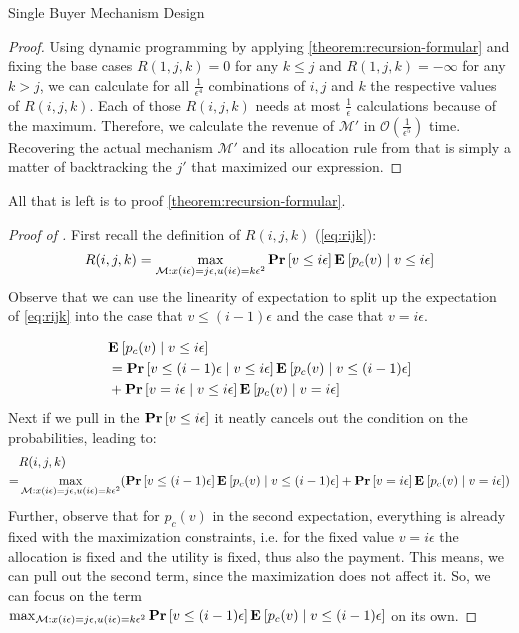 \documentclass[11pt,a4paper]{article}
\renewcommand{\Pr}[1]{\mbox{\rm\bf Pr}\left[#1\right]}
\newcommand{\Ex}[2][]{\mbox{\rm\bf E}_{#1}\left[#2\right]}
\newcommand{\1}[1]{\mbox{\rm\bf 1}_{#1}}
\begin{document}
\begin{section}{Single Buyer Mechanism Design}
\begin{proof}
     Using dynamic programming by applying \cref{theorem:recursion-formular} and fixing the base cases $R(1,j,k) = 0$ for any $k \leq j$ and $R(1,j,k)=-\infty$ for any $k > j$,
     we can calculate for all $\frac{1}{\epsilon^4}$ combinations of $i,j$ and $k$ the respective values of $R(i,j,k)$.
     Each of those $R(i,j,k)$ needs at most $\frac{1}{\epsilon}$ calculations because of the maximum.
     Therefore, we calculate the revenue of $\mathcal{M}'$ in $\mathcal{O}\left(\frac{1}{\epsilon^5}\right)$ time.
     Recovering the actual mechanism $\mathcal{M}'$ and its allocation rule from that is simply a matter of backtracking the $j'$ that maximized our expression.
 \end{proof}

 All that is left is to proof \cref{theorem:recursion-formular}.
 \begin{proof}[Proof of ]
     First recall the definition of $R(i,j,k)$ (\cref{eq:rijk}):
     \begin{align*}
         R(i,j,k) = \max_{\mathcal{M}: x(i\epsilon) = j\epsilon, u(i\epsilon) = k \epsilon^2} \Pr{v \leq i\epsilon}\Ex{p_c(v)\mid v \leq i \epsilon}
     \end{align*}
     Observe that we can use the linearity of expectation to split up the expectation of \cref{eq:rijk} into the case that $v \leq (i-1)\epsilon$ and the case that $v = i \epsilon$.

     \begin{align*}
          & \Ex{p_c(v)\mid v \leq i \epsilon}                                                           \\
          & = \Pr{v \leq (i-1)\epsilon \mid v \leq i \epsilon} \Ex{p_c(v) \mid v \leq (i - 1) \epsilon} \\
          & + \Pr{v = i \epsilon \mid v \leq i \epsilon} \Ex{p_c(v) \mid v = i \epsilon}
     \end{align*}
     Next if we pull in the $\Pr{v \leq i\epsilon}$ it neatly cancels out the condition on the probabilities, leading to:
     \begin{align*}
           & R(i,j,k)                                                                                                                                                                                             \\
         = & \max_{\mathcal{M}: x(i\epsilon) = j\epsilon, u(i\epsilon) = k \epsilon^2} (\Pr{v \leq (i-1)\epsilon} \Ex{p_c(v) \mid v \leq (i - 1) \epsilon} + \Pr{v = i \epsilon} \Ex{p_c(v) \mid v = i \epsilon})
     \end{align*}
     Further, observe that for $p_c(v)$ in the second expectation, everything is already fixed with the maximization constraints, i.e. for the fixed value $v = i \epsilon$ the allocation is fixed and the utility is fixed, thus also the payment.
     This means, we can pull out the second term, since the maximization does not affect it.
     So, we can focus on the term $\max_{\mathcal{M}: x(i\epsilon) = j\epsilon, u(i\epsilon)=k\epsilon^2} \Pr{v \leq (i-1)\epsilon} \Ex{p_c(v) \mid v \leq (i - 1) \epsilon}$ on its own.


\end{proof}
\end{section}
\end{document}
